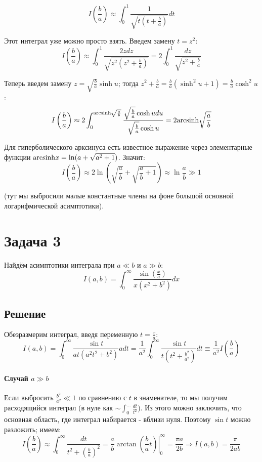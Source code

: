 \documentclass[a4paper,12pt]{article}
\begin{document}
\[
I\left(\frac{b}{a}\right)\approx\int_{0}^{1}\frac{1}{\sqrt{t\left(t+\frac{b}{a}\right)}}dt
\]

\noindent
Этот интеграл уже можно просто взять. Введем замену $t=z^{2}$:
\[
I\left(\frac{b}{a}\right)\approx\int_{0}^{1}\frac{2zdz}{\sqrt{z^{2}\left(z^{2}+\frac{b}{a}\right)}}=2\int_{0}^{1}\frac{dz}{\sqrt{z^{2}+\frac{b}{a}}}
\]

\noindent
Теперь введем замену $z=\sqrt{\frac{b}{a}}\sinh u$; тогда $z^{2}+\frac{b}{a}=\frac{b}{a}\left(\sinh^{2}u+1\right)=\frac{b}{a}\cosh^{2}u$:
\[
I\left(\frac{b}{a}\right)\approx2\int_{0}^{{\rm arcsinh}\sqrt{\frac{a}{b}}}\frac{\sqrt{\frac{b}{a}}\cosh udu}{\sqrt{\frac{b}{a}}\cosh u}=2{\rm arcsinh}\sqrt{\frac{a}{b}}
\]

\noindent
Для гиперболического арксинуса есть известное выражение через элементарные функции ${\rm arcsinh}x = \ln(a + \sqrt{a^2+1})$. Значит:
\[
I\left(\frac{b}{a}\right)\approx2\ln\left(\sqrt{\frac{a}{b}}+\sqrt{\frac{a}{b}+1}\right)\approx\ln\frac{a}{b}\gg1
\]

\noindent
(тут мы выбросили малые константные члены на фоне большой основной логарифмической асимптотики).


\section*{Задача 3}

Найдём асимптотики интеграла при $a\ll b$ и $a\gg b$:
\[
I\left(a,b\right)=\int_{0}^{\infty}\frac{\sin(\frac{x}{a})}{x(x^{2}+b^{2})}dx
\]



\subsection*{Решение}

Обезразмерим интеграл, введя переменную $t=\frac{x}{a}$:
\[
I\left(a,b\right)=\int_{0}^{\infty}\frac{\sin t}{at(a^{2}t^{2}+b^{2})}adt=\frac{1}{a^{2}}\int_{0}^{\infty}\frac{\sin t}{t\left(t^{2}+\frac{b^{2}}{a^{2}}\right)}dt\equiv\frac{1}{a^{2}}I\left(\frac{b}{a}\right)
\]



\paragraph{Случай $a\gg b$}

Если выбросить $\frac{b^{2}}{a^{2}}\ll1$ по сравнению с $t$ в знаменателе,
то мы получим расходящийся интеграл (в нуле как $\sim\int_{0}^{\dots}\frac{dt}{t^{2}}$).
Из этого можно заключить, что основная область, где интеграл набирается
- вблизи нуля. Поэтому $\sin t$ можно разложить; имеем:
\[
I\left(\frac{b}{a}\right)\approx\int_{0}^{\infty}\frac{dt}{t^{2}+\left(\frac{b}{a}\right)^{2}}=\frac{a}{b}\left.\arctan\left(\frac{b}{a}t\right)\right|_{0}^{\infty}=\frac{\pi a}{2b}\Rightarrow I(a,b) = \frac{\pi}{2 a b}
\]
\end{document}
